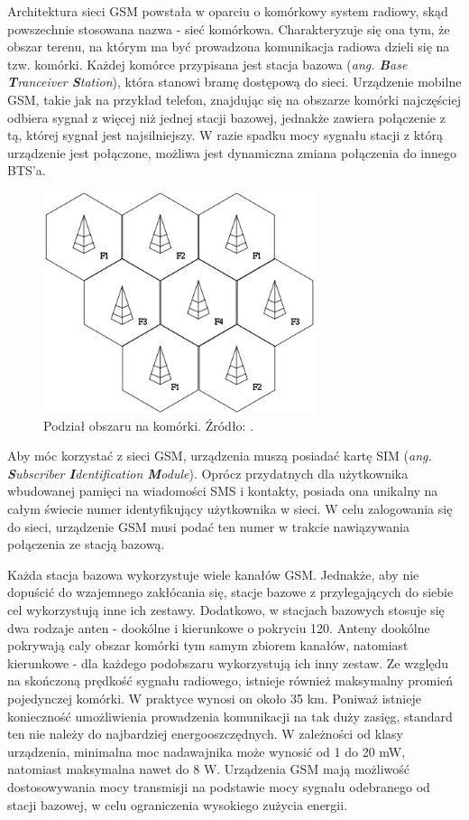 Architektura sieci GSM powstała w oparciu o komórkowy system radiowy, skąd powszechnie stosowana nazwa - sieć komórkowa. Charakteryzuje się ona tym, że obszar terenu, na którym ma być prowadzona komunikacja radiowa dzieli się na tzw. komórki. Każdej komórce przypisana jest stacja bazowa (\textit{ang. \textbf{B}ase \textbf{T}ranceiver \textbf{S}tation}), która stanowi bramę dostępową do sieci. Urządzenie mobilne GSM, takie jak na przykład telefon, znajdując się na obszarze komórki najczęściej odbiera sygnał z więcej niż jednej stacji bazowej, jednakże zawiera połączenie z tą, której sygnał jest najsilniejszy. W razie spadku mocy sygnału stacji z którą urządzenie jest połączone, możliwa jest dynamiczna zmiana połączenia do innego BTS'a.

\begin{figure}[H]
	\centering
	\includegraphics[width=8cm]{img/theory/GSM/cell_structure.png}
	\caption{Podział obszaru na komórki. Źródło: \cite{GSM_wiki}.}
	\label{fig:image_gsm_cells}
\end{figure}

Aby móc korzystać z sieci GSM, urządzenia muszą posiadać kartę SIM (\textit{ang. \textbf{S}ubscriber \textbf{I}dentification \textbf{M}odule}). Oprócz przydatnych dla użytkownika wbudowanej pamięci na wiadomości SMS i kontakty, posiada ona unikalny na całym świecie numer identyfikujący użytkownika w sieci. W celu zalogowania się do sieci, urządzenie GSM musi podać ten numer w trakcie nawiązywania połączenia ze stacją bazową. 

Każda stacja bazowa wykorzystuje wiele kanałów GSM. Jednakże, aby nie dopuścić do wzajemnego zakłócania się, stacje bazowe z przylegających do siebie cel wykorzystują inne ich zestawy. Dodatkowo, w stacjach bazowych stosuje się dwa rodzaje anten - dookólne i kierunkowe o pokryciu 120\degree. Anteny dookólne pokrywają caly obszar komórki tym samym zbiorem kanałów, natomiast kierunkowe - dla każdego podobszaru wykorzystują ich inny zestaw. Ze względu na skończoną prędkość sygnału radiowego, istnieje również maksymalny promień pojedynczej komórki. W praktyce wynosi on około 35 km. Poniważ istnieje konieczność umożliwienia prowadzenia komunikacji na tak duży zasięg, standard ten nie należy do najbardziej energooszczędnych. W zależności od klasy urządzenia, minimalna moc nadawajnika może wynosić od 1 do 20 mW, natomiast maksymalna nawet do 8 W. Urządzenia GSM mają możliwość dostosowywania mocy transmisji na podstawie mocy sygnału odebranego od stacji bazowej, w celu ograniczenia wysokiego zużycia energii. 

